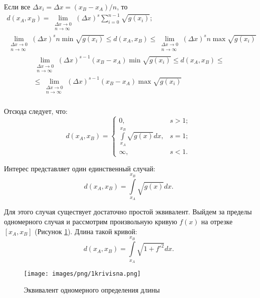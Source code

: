 \documentclass[a4paper,14pt]{extreport} %
\begin{document}
	Если все $\Delta x_i = \Delta x = (x_B - x_A)/n$, то 
	\begin{equation*}
		\begin{gathered}
			d(x_A, x_B) =  \lim\limits_{\substack{\Delta x\to 0 \\ n \to \infty}} (\Delta x)^s \sum\limits_{i = 0}^{n-1} \sqrt{g(x_i)}; \\
			\lim\limits_{\substack{\Delta x \to 0 \\ n \to \infty}} (\Delta x)^s n \min \sqrt{g(x_i)} \leqslant
			d(x_A, x_B) \leqslant
			\lim\limits_{\substack{\Delta x \to 0 \\ n \to \infty}} (\Delta x)^s n \max \sqrt{g(x_i)}
		\end{gathered}
	\end{equation*}
	\begin{equation*}
		\begin{gathered}
			\lim\limits_{\substack{\Delta x \to 0 \\ n \to \infty}} (\Delta x)^{s-1} (x_B - x_A) \min \sqrt{g(x_i)} \leqslant
			d(x_A, x_B) \leqslant \\ \leqslant
			\lim\limits_{\substack{\Delta x \to 0 \\ n \to \infty}} (\Delta x)^{s-1} (x_B - x_A) \max \sqrt{g(x_i)} \\
		\end{gathered}
	\end{equation*}
	
	Отсюда следует, что:
	\[
		d(x_A, x_B) =
		\begin{cases}
			0, & s>1; \\
			\int\limits_{x_A}^{x_B} \sqrt{g(x)} dx, & s = 1; \\
			\infty, &  s<1.
		\end{cases}
	\]
	
	Интерес представляет один единственный случай:
	\[
		d(x_A, x_B) =
		\int\limits_{x_A}^{x_B} \sqrt{g(x)} dx.
	\]
	
	Для этого случая существует достаточно простой эквивалент. Выйдем за пределы одномерного случая и рассмотрим произвольную кривую $f(x)$ на отрезке $[x_A, x_B]$ (Рисунок \ref{fig1krivisna}). Длина такой кривой:
	\[
		d(x_A, x_B) =
		\int\limits_{x_A}^{x_B} \sqrt{1 + f'^2} dx.
	\]
	
	\begin{figure}[ht]
		\centering
		\texttt{[image: images/png/1krivisna.png]}
		\caption{Эквивалент одномерного определения длины}
		\label{fig1krivisna}
	\end{figure}
	
\end{document}
